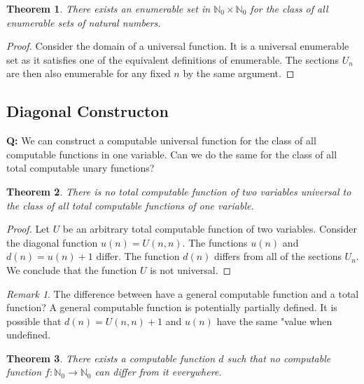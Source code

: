 \documentclass[10pt, letterpaper]{article}
\newcommand{\N}{\mathbb{N}}
\newtheorem{thm}{Theorem}
\theoremstyle{remark}
\newtheorem{rem}{Remark}
\theoremstyle{definition}
\begin{document}
    \begin{thm}
        There exists an enumerable set in $\N_0 \times \N_0$ for the class of all enumerable sets of natural numbers.
    \end{thm}

    \begin{proof}
        Consider the domain of a universal function. It is a universal enumerable set as it satisfies one of the equivalent 
        definitions of enumerable. The sections $U_n$ are then also enumerable for any fixed $n$ by the same argument.
    \end{proof}

    \subsection*{Diagonal Constructon}

    \textbf{Q: } We can construct a computable universal function for the class of all computable functions in one variable.
    Can we do the same for the class of all total computable unary functions?

    \begin{thm}
        There is no total computable function of two variables universal to the class of all total computable functions 
        of one variable.
    \end{thm}

    \begin{proof}
        Let $U$ be an arbitrary total computable function of two variables. Consider the diagonal function $u(n) = U(n,n)$.
        The functions $u(n)$ and $d(n) = u(n)+1$ differ. The function $d(n)$ differs from all of the sections $U_n$. We conclude
        that the function $U$ is not universal.
    \end{proof}

    \begin{rem}
        The difference between have a general computable function and a total function? A general computable function is 
        potentially partially defined. It is possible that $d(n) = U(n,n) + 1$ and $u(n)$ have the same "value when undefined.
    \end{rem}

    \begin{thm}
        There exists a computable function $d$ such that no computable function $f:\N_0 \rightarrow \N_0$ can differ from it 
        everywhere.
    \end{thm}
\end{document}
